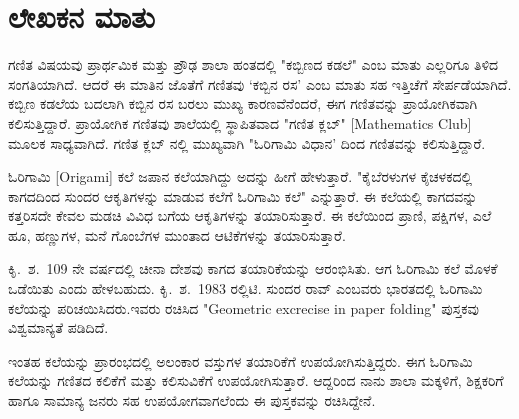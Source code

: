 {
\makeatletter
\def\@makechapterhead#1{%
  \vspace*{5\p@}%
  {\parindent \z@ \raggedright \normalfont
    \ifnum \c@secnumdepth >\m@ne
      \if@mainmatter
        \LARGE\bfseries \@chapapp\space\thechapter
        \vskip 4pt
        \par\nobreak
        \vskip 5\p@
      \fi
    \fi
    \interlinepenalty\@M
    \LARGE\bfseries #1\par\nobreak
    \vskip 15\p@
  }}
  \makeatother




\chapter*{ಲೇಖಕನ ಮಾತು}

ಗಣಿತ  ವಿಷಯವು ಪ್ರಾರ್ಥಮಿಕ ಮತ್ತು ಪ್ರೌಢ ಶಾಲಾ ಹಂತದಲ್ಲಿ "ಕಬ್ಬಿಣದ ಕಡಲೆ" ಎಂಬ ಮಾತು ಎಲ್ಲರಿಗೂ ತಿಳಿದ ಸಂಗತಿಯಾಗಿದೆ. ಆದರೆ ಈ ಮಾತಿನ ಜೊತೆಗೆ  ಗಣಿತವು `ಕಬ್ಬಿನ ರಸ' ಎಂಬ ಮಾತು ಸಹ ಇತ್ತಿಚೆಗೆ ಸೇರ್ಪಡೆಯಾಗಿದೆ. ಕಬ್ಬಿಣ ಕಡಲೆಯ ಬದಲಾಗಿ ಕಬ್ಬಿನ ರಸ ಬರಲು ಮುಖ್ಯ ಕಾರಣವೆನೆಂದರೆ, ಈಗ ಗಣಿತವನ್ನು ಪ್ರಾಯೋಗಿಕವಾಗಿ ಕಲಿಸುತ್ತಿದ್ದಾರೆ. ಪ್ರಾಯೋಗಿಕ ಗಣಿತವು ಶಾಲೆಯಲ್ಲಿ ಸ್ಥಾಪಿತವಾದ "ಗಣಿತ ಕ್ಲಬ್" [Mathematics Club] ಮೂಲಕ ಸಾಧ್ಯವಾಗಿದೆ. ಗಣಿತ ಕ್ಲಬ್ ನಲ್ಲಿ ಮುಖ್ಯವಾಗಿ "ಓರಿಗಾಮಿ ವಿಧಾನ' ದಿಂದ ಗಣಿತವನ್ನು ಕಲಿಸುತ್ತಿದ್ದಾರೆ. 

\medskip

ಓರಿಗಾಮಿ [Origami] ಕಲೆ ಜಪಾನ ಕಲೆಯಾಗಿದ್ದು ಅದನ್ನು ಹೀಗೆ ಹೇಳುತ್ತಾರೆ. "ಕೈ\break ಬೆರಳುಗಳ ಕೈಚಳಕದಲ್ಲಿ ಕಾಗದದಿಂದ ಸುಂದರ ಆಕೃತಿಗಳನ್ನು ಮಾಡುವ ಕಲೆಗೆ ಓರಿಗಾಮಿ ಕಲೆ" ಎನ್ನುತ್ತಾರೆ. ಈ ಕಲೆಯಲ್ಲಿ ಕಾಗದವನ್ನು ಕತ್ತರಿಸದೇ ಕೇವಲ ಮಡಚಿ ವಿವಿಧ ಬಗೆಯ ಆಕೃತಿಗಳನ್ನು ತಯಾರಿಸುತ್ತಾರೆ. ಈ ಕಲೆಯಿಂದ ಪ್ರಾಣಿ, ಪಕ್ಷಿಗಳ, ಎಲೆ ಹೂ, ಹಣ್ಣುಗಳ, ಮನೆ ಗೊಂಬೆಗಳ ಮುಂತಾದ ಆಟಿಕೆಗಳನ್ನು ತಯಾರಿಸುತ್ತಾರೆ. 

\medskip

ಕಿೃ.~ಶ.~109 ನೇ ವರ್ಷದಲ್ಲಿ ಚೀನಾ ದೇಶವು ಕಾಗದ ತಯಾರಿಕೆಯನ್ನು ಆರಂಭಿಸಿತು. ಆಗ ಓರಿಗಾಮಿ ಕಲೆ ಮೊಳಕೆ ಒಡೆಯಿತು ಎಂದು ಹೇಳಬಹುದು.  ಕಿೃ.~ಶ.~1983 ರಲ್ಲಿ\break ಟಿ. ಸುಂದರ ರಾವ್ ಎಂಬವರು ಭಾರತದಲ್ಲಿ ಓರಿಗಾಮಿ ಕಲೆಯನ್ನು ಪರಿಚಯಿಸಿದರು.\break ಇವರು ರಚಿಸಿದ "Geometric excrecise in paper folding" ಪುಸ್ತಕವು ವಿಶ್ವಮಾನ್ಯತೆ ಪಡಿದಿದೆ. 

\medskip

ಇಂತಹ ಕಲೆಯನ್ನು ಪ್ರಾರಂಭದಲ್ಲಿ ಅಲಂಕಾರ ವಸ್ತುಗಳ ತಯಾರಿಕೆಗೆ ಉಪಯೋಗಿಸುತ್ತಿದ್ದರು. ಈಗ ಓರಿಗಾಮಿ ಕಲೆಯನ್ನು ಗಣಿತದ ಕಲಿಕೆಗೆ ಮತ್ತು ಕಲಿಸುವಿಕೆಗೆ ಉಪಯೋಗಿಸು\-ತ್ತಾರೆ. ಆದ್ದರಿಂದ ನಾನು ಶಾಲಾ ಮಕ್ಕಳಿಗೆ, ಶಿಕ್ಷಕರಿಗೆ ಹಾಗೂ ಸಾಮಾನ್ಯ ಜನರು ಸಹ ಉಪಯೋಗವಾಗಲೆಂದು ಈ ಪುಸ್ತಕವನ್ನು ರಚಿಸಿದ್ದೇನೆ. 

}
